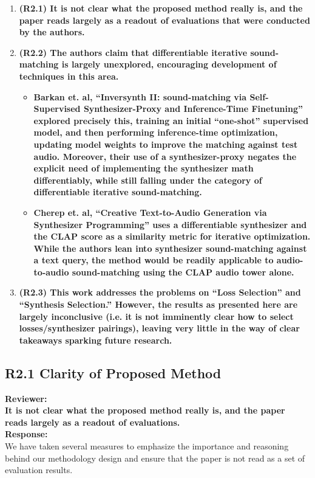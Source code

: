 \documentclass[11pt]{article}
\begin{document}
\begin{enumerate}
  \item \textbf{(R2.1) It is not clear what the proposed method really is, and the paper reads largely as a readout of evaluations that were conducted by the authors.}  
  \item \textbf{(R2.2) The authors claim that differentiable iterative sound-matching is largely unexplored, encouraging development of techniques in this area.}  
    \begin{itemize}
      \item \textbf{Barkan et. al, ``Inversynth II: sound-matching via Self-Supervised Synthesizer-Proxy and Inference-Time Finetuning'' explored precisely this, training an initial ``one-shot'' supervised model, and then performing inference-time optimization, updating model weights to improve the matching against test audio.  Moreover, their use of a synthesizer-proxy negates the explicit need of implementing the synthesizer math differentiably, while still falling under the category of differentiable iterative sound-matching.}  
      \item \textbf{Cherep et. al, ``Creative Text-to-Audio Generation via Synthesizer Programming'' uses a differentiable synthesizer and the CLAP score as a similarity metric for iterative optimization.  While the authors lean into synthesizer sound-matching against a text query, the method would be readily applicable to audio-to-audio sound-matching using the CLAP audio tower alone.}  
    \end{itemize}
  \item \textbf{(R2.3) This work addresses the problems on ``Loss Selection'' and ``Synthesis Selection.''  However, the results as presented here are largely inconclusive (i.e. it is not imminently clear how to select losses/synthesizer pairings), leaving very little in the way of clear takeaways sparking future research.}
\end{enumerate}

\subsection{R2.1 Clarity of Proposed Method}
\label{R2.1}
\noindent\textbf{Reviewer:}\\
\noindent \textbf{It is not clear what the proposed method really is, and the paper reads largely as a readout of evaluations. } 
\\

\noindent\textbf{Response:} \\
We have taken several measures to emphasize the importance and reasoning behind our methodology design and ensure that the paper is not read as a set of evaluation results.  
\end{document}
